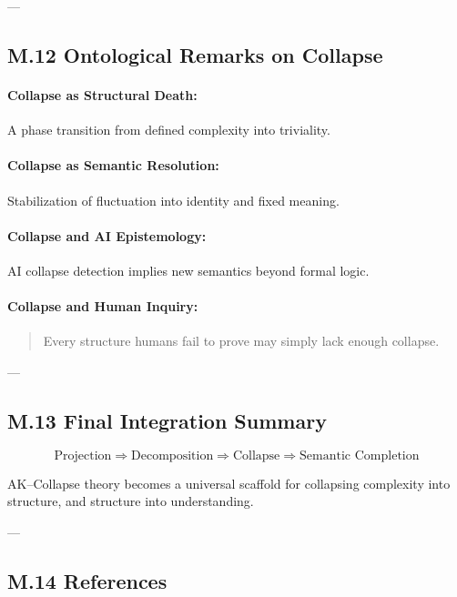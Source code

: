 \documentclass[11pt]{article}
\begin{document}
\begin{axiom}
\begin{axiom}
{{---

\subsection*{M.12 Ontological Remarks on Collapse}

\paragraph{Collapse as Structural Death:}  
A phase transition from defined complexity into triviality.

\paragraph{Collapse as Semantic Resolution:}  
Stabilization of fluctuation into identity and fixed meaning.

\paragraph{Collapse and AI Epistemology:}  
AI collapse detection implies new semantics beyond formal logic.

\paragraph{Collapse and Human Inquiry:}  
\begin{quote}
Every structure humans fail to prove may simply lack enough collapse.
\end{quote}

---

\subsection*{M.13 Final Integration Summary}

\[
\text{Projection} \Rightarrow \text{Decomposition} \Rightarrow \text{Collapse} \Rightarrow \text{Semantic Completion}
\]

AK–Collapse theory becomes a universal scaffold for collapsing complexity  
into structure, and structure into understanding.

---

\subsection*{M.14 References}

\begin{thebibliography}{9}


\end{thebibliography}}}
\end{axiom}
\end{axiom}
\end{document}
